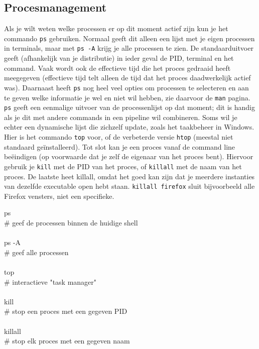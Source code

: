 \subsection{Procesmanagement}\label{procesmanagement}

Als je wilt weten welke processen er op dit moment actief zijn kun je het commando \texttt{ps} gebruiken. Normaal geeft dit alleen een lijst met je eigen processen in terminals, maar met \texttt{ps\ -A} krijg je alle processen te zien. De standaarduitvoer geeft (afhankelijk van je distributie) in ieder geval de PID, terminal en het command. Vaak wordt ook de effectieve tijd die het proces gedraaid heeft meegegeven (effectieve tijd telt alleen de tijd dat het proces daadwerkelijk actief was). Daarnaast heeft \texttt{ps} nog heel veel opties om processen te selecteren en aan te geven welke informatie je wel en niet wil hebben, zie daarvoor de \texttt{man} pagina. \texttt{ps} geeft een eenmalige uitvoer van de processenlijst op dat moment; dit is handig als je dit met andere commands in een pipeline wil combineren. Soms wil je echter een dynamische lijst die zichzelf update, zoals het taakbeheer in Windows. Hier is het commando \texttt{top} voor, of de verbeterde versie \texttt{htop} (meestal niet standaard geïnstalleerd). Tot slot kan je een proces vanaf de command line beëindigen (op voorwaarde dat je zelf de eigenaar van het proces bent). Hiervoor gebruik je \texttt{kill} met de PID van het proces, of \texttt{killall} met de naam van het proces. De laatste heet killall, omdat het goed kan zijn dat je meerdere instanties van dezelfde executable open hebt staan. \texttt{killall\ firefox} sluit bijvoorbeeld alle Firefox vensters, niet een specifieke.

\begin{bash}
\userprompt[~] ps\\
\# geef de processen binnen de huidige shell\\
\\
\userprompt[~] ps -A\\
\# geef alle processen\\
\\
\userprompt[~] top\\
\# interactieve "task manager"\\
\\
\userprompt[~] kill\\
\# stop een proces met een gegeven PID\\
\\
\userprompt[~] killall\\
\# stop elk proces met een gegeven naam\\
\end{bash}


